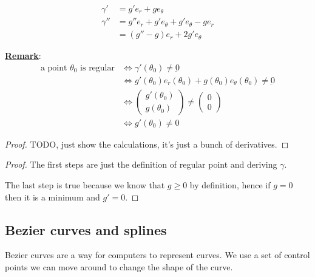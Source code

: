 \documentclass[10pt]{extarticle}
\renewcommand{\vec}[1]{\underbar{\ensuremath{#1}}}
\begin{document}
\begin{align*}
    \gamma'  & = g' e_r + g e_\theta                         \\
    \gamma'' & = g'' e_r + g' e_\theta + g' e_\theta - g e_r \\
             & = (g'' - g) e_r + 2 g' e_\theta
\end{align*}


\textbf{\underline{Remark}}:
\begin{align*}
    \text{a point $\theta_0$ is regular} & \iff \gamma'(\theta_0) \ne \vec{0}                                           \\
                                         & \iff g'(\theta_0) e_r(\theta_0) + g(\theta_0) e_\theta(\theta_0) \ne \vec{0} \\
                                         & \iff \begin{pmatrix}
                                                    g'(\theta_0) \\ g(\theta_0)
                                                \end{pmatrix} \ne \begin{pmatrix}
                                                                      0 \\ 0
                                                                  \end{pmatrix}                                        \\
                                         & \iff g'(\theta_0) \ne 0
\end{align*}

\begin{proof}
    TODO, just show the calculations, it's just a bunch of derivatives.
\end{proof}

\begin{proof}
    The first steps are just the definition of regular point and deriving $\gamma$.

    The last step is true because we know that $g \geq 0$ by definition, hence if $g = 0$ then it is a minimum and $g' = 0$.
\end{proof}

\subsection{Bezier curves and splines}

Bezier curves are a way for computers to represent curves.
We use a set of control points we can move around to change the shape of the curve.
\end{document}
